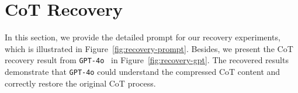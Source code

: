 \section{CoT Recovery}
\label{appendix:recovery}

In this section, we provide the detailed prompt for our recovery experiments, which is illustrated in Figure~\ref{fig:recovery-prompt}. Besides, we present the CoT recovery result from \texttt{GPT-4o}~\cite{gpt-4} in Figure~\ref{fig:recovery-gpt}. The recovered results demonstrate that \texttt{GPT-4o} could understand the compressed CoT content and correctly restore the original CoT process.




